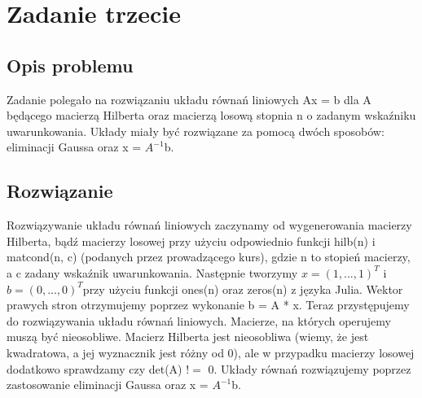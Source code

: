 \documentclass[8pt,letterpaper]{article}
\begin{document}
\section{Zadanie trzecie}
  
\subsection{Opis problemu}

\hspace{1.0 cm} Zadanie polegało na rozwiązaniu układu równań liniowych Ax = b dla A będącego macierzą Hilberta oraz macierzą losową stopnia n o zadanym wskaźniku uwarunkowania. Układy miały być rozwiązane za pomocą dwóch sposobów: eliminacji Gaussa oraz x = $A^{-1}$b.
 
\subsection{Rozwiązanie}
\hspace{1.0 cm}Rozwiązywanie układu równań liniowych zaczynamy od wygenerowania macierzy Hilberta, bądź macierzy losowej przy użyciu odpowiednio funkcji hilb(n) i matcond(n, c) (podanych przez prowadzącego kurs), gdzie n to stopień macierzy, a c zadany wskaźnik uwarunkowania. Następnie tworzymy $x = (1, ..., 1) ^{T}  $ i  $b = (0, ..., 0)^{T} $przy użyciu funkcji ones(n) oraz zeros(n) z języka Julia. Wektor prawych stron otrzymujemy poprzez wykonanie b = A * x. Teraz przystępujemy do rozwiązywania układu równań liniowych. Macierze, na których operujemy muszą być nieosobliwe. Macierz Hilberta jest nieosobliwa (wiemy, że jest kwadratowa, a jej wyznacznik jest różny od 0), ale w przypadku macierzy losowej dodatkowo sprawdzamy czy det(A) $!=$ 0. Układy równań rozwiązujemy poprzez zastosowanie eliminacji Gaussa  oraz x = $A^{-1}$b.
\end{document}
